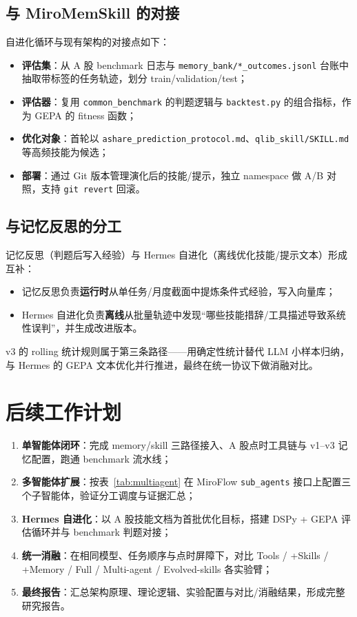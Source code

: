 \documentclass[11pt]{article}
\begin{document}
\subsection{与 MiroMemSkill 的对接}

自进化循环与现有架构的对接点如下：
\begin{itemize}
    \item \textbf{评估集}：从 A 股 benchmark 日志与 \texttt{memory\_bank/*\_outcomes.jsonl} 台账中抽取带标签的任务轨迹，划分 train/validation/test；
    \item \textbf{评估器}：复用 \texttt{common\_benchmark} 的判题逻辑与 \texttt{backtest.py} 的组合指标，作为 GEPA 的 fitness 函数；
    \item \textbf{优化对象}：首轮以 \texttt{ashare\_prediction\_protocol.md}、\texttt{qlib\_skill/SKILL.md} 等高频技能为候选；
    \item \textbf{部署}：通过 Git 版本管理演化后的技能/提示，独立 namespace 做 A/B 对照，支持 \texttt{git revert} 回滚。
\end{itemize}

\subsection{与记忆反思的分工}

记忆反思（判题后写入经验）与 Hermes 自进化（离线优化技能/提示文本）形成互补：
\begin{itemize}
    \item 记忆反思负责\textbf{运行时}从单任务/月度截面中提炼条件式经验，写入向量库；
    \item Hermes 自进化负责\textbf{离线}从批量轨迹中发现“哪些技能措辞/工具描述导致系统性误判”，并生成改进版本。
\end{itemize}
v3 的 rolling 统计规则属于第三条路径——用确定性统计替代 LLM 小样本归纳，与 Hermes 的 GEPA 文本优化并行推进，最终在统一协议下做消融对比。

\section{后续工作计划}

\begin{enumerate}
    \item \textbf{单智能体闭环}：完成 memory/skill 三路径接入、A 股点时工具链与 v1--v3 记忆配置，跑通 benchmark 流水线；
    \item \textbf{多智能体扩展}：按表~\ref{tab:multiagent} 在 MiroFlow \texttt{sub\_agents} 接口上配置三个子智能体，验证分工调度与证据汇总；
    \item \textbf{Hermes 自进化}：以 A 股技能文档为首批优化目标，搭建 DSPy + GEPA 评估循环并与 benchmark 判题对接；
    \item \textbf{统一消融}：在相同模型、任务顺序与点时屏障下，对比 Tools / +Skills / +Memory / Full / Multi-agent / Evolved-skills 各实验臂；
    \item \textbf{最终报告}：汇总架构原理、理论逻辑、实验配置与对比/消融结果，形成完整研究报告。
\end{enumerate}
\end{document}
